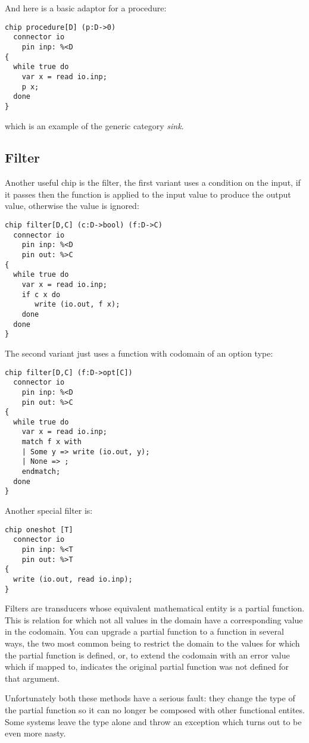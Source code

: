 \documentclass[oneside]{book}
\begin{document}
And here is a basic adaptor for a procedure:

\begin{verbatim}
chip procedure[D] (p:D->0)
  connector io
    pin inp: %<D
{
  while true do 
    var x = read io.inp;
    p x;
  done
}
\end{verbatim}

which is an example of the generic category {\em sink}.

\subsection{Filter}
Another useful chip is the filter, the first variant
uses a condition on the input, if it passes then the
function is applied to the input value to produce
the output value, otherwise the value is ignored:

\begin{verbatim}
chip filter[D,C] (c:D->bool) (f:D->C)
  connector io
    pin inp: %<D
    pin out: %>C
{
  while true do
    var x = read io.inp;
    if c x do
       write (io.out, f x);
    done
  done
}
\end{verbatim}

The second variant just uses a function with codomain
of an option type:

\begin{verbatim}
chip filter[D,C] (f:D->opt[C])
  connector io
    pin inp: %<D
    pin out: %>C
{
  while true do
    var x = read io.inp;
    match f x with
    | Some y => write (io.out, y);
    | None => ;
    endmatch;
  done
}
\end{verbatim}

Another special filter is:

\begin{verbatim}
chip oneshot [T]
  connector io
    pin inp: %<T
    pin out: %>T
{
  write (io.out, read io.inp);
}
\end{verbatim}

Filters are transducers whose equivalent mathematical entity is
a partial function. This is relation for which not all values in
the domain have a corresponding value in the codomain.
You can upgrade a partial function to a function in several ways,
the two most common being to restrict the domain to the values for which
the partial function is defined, or, to extend the codomain with an
error value which if mapped to, indicates the original partial
function was not defined for that argument.

Unfortunately both these methods have a serious fault: they change
the type of the partial function so it can no longer be composed
with other functional entites. Some systems leave the type alone
and throw an exception which turns out to be even more nasty.
\end{document}
